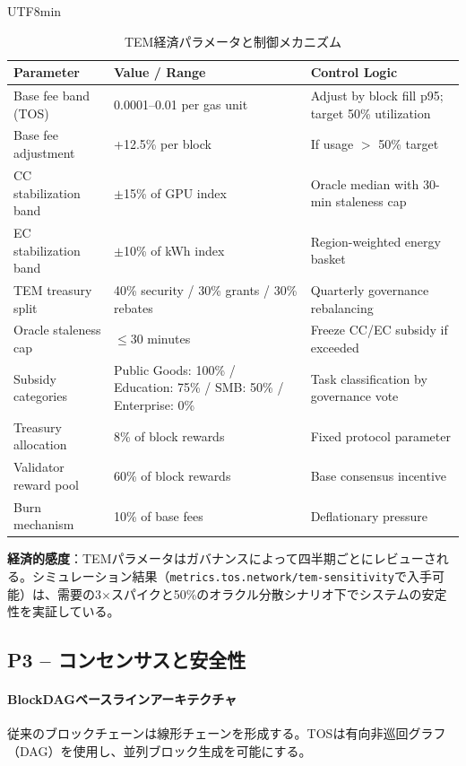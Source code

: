 \documentclass[11pt]{article}
\begin{document}
\begin{CJK}{UTF8}{min}
\begin{table}[H]
\centering
\caption{TEM経済パラメータと制御メカニズム}
\label{tab:tem-parameters}
\begin{tabular}{@{}p{}p{}p{}@{}}
\toprule
\textbf{Parameter} & \textbf{Value / Range} & \textbf{Control Logic} \\ \midrule
Base fee band (TOS) & 0.0001--0.01 per gas unit & Adjust by block fill p95; target 50\% utilization \\
Base fee adjustment & +12.5\% per block & If usage $>$ 50\% target \\
CC stabilization band & $\pm$15\% of GPU index & Oracle median with 30-min staleness cap \\
EC stabilization band & $\pm$10\% of kWh index & Region-weighted energy basket \\
TEM treasury split & 40\% security / 30\% grants / 30\% rebates & Quarterly governance rebalancing \\
Oracle staleness cap & $\le$30 minutes & Freeze CC/EC subsidy if exceeded \\
Subsidy categories & Public Goods: 100\% / Education: 75\% / SMB: 50\% / Enterprise: 0\% & Task classification by governance vote \\
Treasury allocation & 8\% of block rewards & Fixed protocol parameter \\
Validator reward pool & 60\% of block rewards & Base consensus incentive \\
Burn mechanism & 10\% of base fees & Deflationary pressure \\
\bottomrule
\end{tabular}
\end{table}

\textbf{経済的感度}：TEMパラメータはガバナンスによって四半期ごとにレビューされる。シミュレーション結果（\texttt{metrics.tos.network/tem-sensitivity}で入手可能）は、需要の3$\times$スパイクと50\%のオラクル分散シナリオ下でシステムの安定性を実証している。

\subsection{P3 -- コンセンサスと安全性}
\label{sec:pillar-consensus}

\paragraph{BlockDAGベースラインアーキテクチャ}
従来のブロックチェーンは線形チェーンを形成する。TOSは有向非巡回グラフ（DAG）を使用し、並列ブロック生成を可能にする。


\end{CJK}
\end{document}
